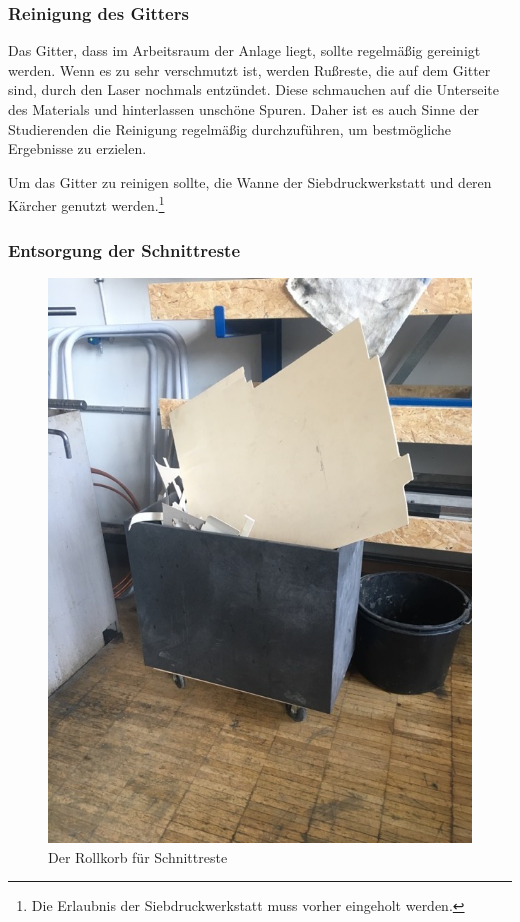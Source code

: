 \documentclass[]{article}
\begin{document}
\hypertarget{reinigung-des-gitters}{%
\subsubsection{Reinigung des Gitters}\label{reinigung-des-gitters}}

Das Gitter, dass im Arbeitsraum der Anlage liegt, sollte regelmäßig
gereinigt werden. Wenn es zu sehr verschmutzt ist, werden Rußreste, die
auf dem Gitter sind, durch den Laser nochmals entzündet. Diese
schmauchen auf die Unterseite des Materials und hinterlassen unschöne
Spuren. Daher ist es auch Sinne der Studierenden die Reinigung
regelmäßig durchzuführen, um bestmögliche Ergebnisse zu erzielen.

Um das Gitter zu reinigen sollte, die Wanne der Siebdruckwerkstatt und
deren Kärcher genutzt werden.\footnote{Die Erlaubnis der
  Siebdruckwerkstatt muss vorher eingeholt werden.}

\hypertarget{entsorgung-der-schnittreste}{%
\subsubsection{Entsorgung der
Schnittreste}\label{entsorgung-der-schnittreste}}

\begin{figure}
\hypertarget{fig:schnitt-reste}{%
\centering
\includegraphics{assets/images/laser-schnittreste.JPG}
\caption{Der Rollkorb für Schnittreste}\label{fig:schnitt-reste}
}
\end{figure}
\end{document}
